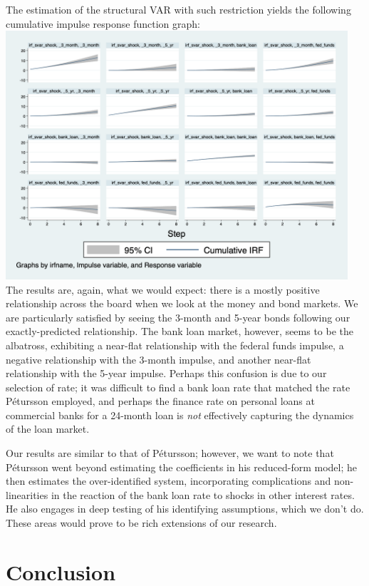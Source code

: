 \documentclass[12pt,final]{article}
\begin{document}
The estimation of the structural VAR with such restriction yields the following cumulative impulse response function graph: \\
\includegraphics[width=5in]{irf_svar_shock.png} \\
The results are, again, what we would expect: there is a mostly positive relationship across the board when we look at the money and bond markets. We are particularly satisfied by seeing the 3-month and 5-year bonds following our exactly-predicted relationship. The bank loan market, however, seems to be the albatross, exhibiting a near-flat relationship with the federal funds impulse, a negative relationship with the 3-month impulse, and another near-flat relationship with the 5-year impulse. Perhaps this confusion is due to our selection of rate; it was difficult to find a bank loan rate that matched the rate Pétursson employed, and perhaps the finance rate on personal loans at commercial banks for a 24-month loan is \textit{not} effectively capturing the dynamics of the loan market.

Our results are similar to that of Pétursson; however, we want to note that Pétursson went beyond estimating the coefficients in his reduced-form model; he then estimates the over-identified system, incorporating complications and non-linearities in the reaction of the bank loan rate to shocks in other interest rates. He also engages in deep testing of his identifying assumptions, which we don't do. These areas would prove to be rich extensions of our research. 

\section{Conclusion}
\end{document}
